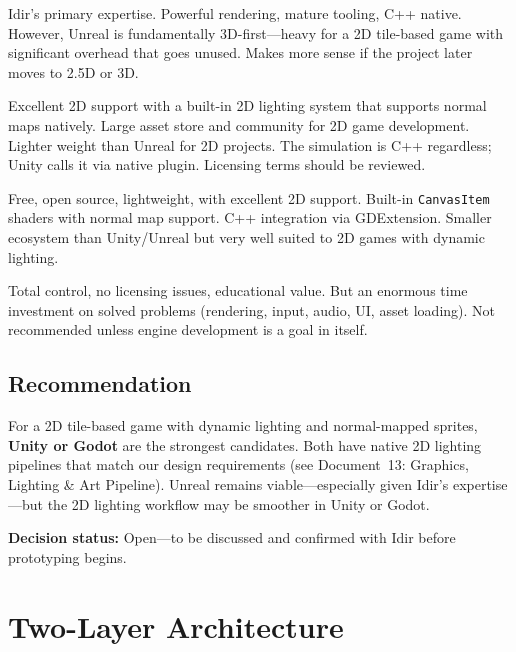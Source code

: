 \documentclass[11pt,a4paper]{article}
\begin{document}
\begin{description}[style=nextline]
    \item[Unreal Engine]
        Idir's primary expertise.  Powerful rendering, mature tooling,
        C++ native.  However, Unreal is fundamentally 3D-first---heavy
        for a 2D tile-based game with significant overhead that goes
        unused.  Makes more sense if the project later moves to 2.5D
        or 3D.

    \item[Unity]
        Excellent 2D support with a built-in 2D lighting system that
        supports normal maps natively.  Large asset store and community
        for 2D game development.  Lighter weight than Unreal for 2D
        projects.  The simulation is C++ regardless; Unity calls it via
        native plugin.  Licensing terms should be reviewed.

    \item[Godot]
        Free, open source, lightweight, with excellent 2D support.
        Built-in \texttt{CanvasItem} shaders with normal map support.
        C++ integration via GDExtension.  Smaller ecosystem than
        Unity/Unreal but very well suited to 2D games with dynamic
        lighting.

    \item[Custom Engine]
        Total control, no licensing issues, educational value.  But an
        enormous time investment on solved problems (rendering, input,
        audio, UI, asset loading).  Not recommended unless engine
        development is a goal in itself.
\end{description}

\subsection{Recommendation}

For a 2D tile-based game with dynamic lighting and normal-mapped
sprites, \textbf{Unity or Godot} are the strongest candidates.  Both
have native 2D lighting pipelines that match our design requirements
(see Document~13: Graphics, Lighting \& Art Pipeline).  Unreal remains
viable---especially given Idir's expertise---but the 2D lighting
workflow may be smoother in Unity or Godot.

\medskip
\noindent\textbf{Decision status:} Open---to be discussed and confirmed
with Idir before prototyping begins.

\section{Two-Layer Architecture}
\label{sec:twolayer}
\end{document}
